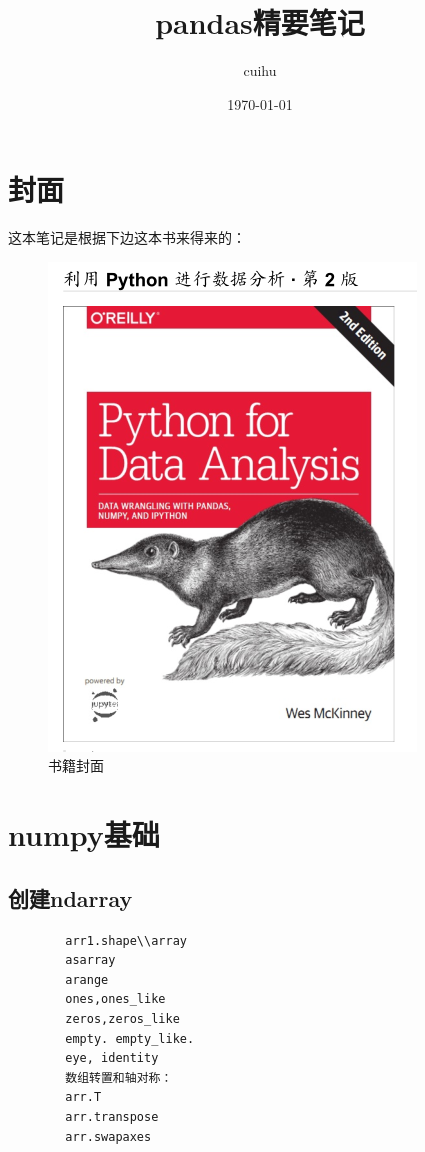 \documentclass{article}
\title{pandas精要笔记}
\author{cuihu}
\date{\today}
\begin{document}
	\tableofcontents
	\maketitle
	\setcounter{section}{0}
	\section{封面}
	这本笔记是根据下边这本书来得来的：
	\begin{figure}[htpb]
		\centering
		\includegraphics[width=.5\linewidth]{fig/book}
		\caption{书籍封面}
		\label{fig-book}
	\end{figure}
	\section{numpy基础}
	\subsection{创建ndarray}
	\begin{lstlisting}
		arr1.shape\\array
		asarray
		arange
		ones,ones_like
		zeros,zeros_like
		empty. empty_like.
		eye, identity
		数组转置和轴对称：
		arr.T
		arr.transpose
		arr.swapaxes
	\end{lstlisting}
	
\end{document}
